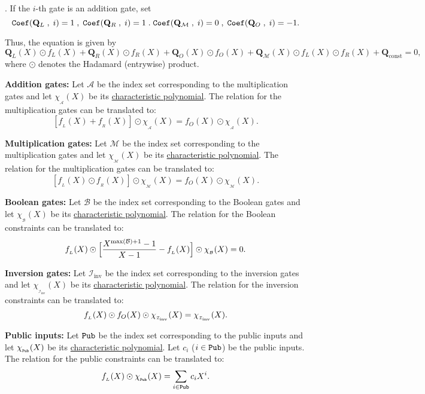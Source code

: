 \documentclass[11pt, lettersize, notitlepage, leqno, footskip=0.6cm]{article}
\newcommand{\mc}{\mathcal}
\newcommand{\mbf}{\mathbf}
\newcommand{\mr}{\mathrm}
\newcommand{\vs}{\vspace{-0.15cm}}
\newcommand{\noin}{\noindent}
\numberwithin{equation}{section}
\begin{document}
\noin 3. If the $i$-th gate is an addition gate, set  \vs $${\tt{Coef}}(\mbf{Q}_{L}\;,\;i) = 1\;,\;{\tt{Coef}}(\mbf{Q}_{R}\;,\;i) = 1 \;.\;{\tt{Coef}}(\mbf{Q}_{\mc{M}}\;,\;i) = 0\;,\;{\tt{Coef}}(\mbf{Q}_{O}\;,\;i) = -1.  $$


\noin Thus, the equation is given by $$ \mbf{Q}_{L}(X)\odot f_{L}(X) + \mbf{Q}_{R}(X)\odot f_{R}(X) + \mbf{Q}_{O}(X)\odot f_{O}(X) + \mbf{Q}_{\mc{M}}(X)\odot f_{L}(X)\odot f_{R}(X) +  \mbf{Q}_{\mr{const}} = 0,$$ where $\odot$ denotes the Hadamard (entrywise) product.

\bigskip






\noin \textbf{Addition gates:} Let $\mc{A}$ be the index set corresponding to the multiplication gates and let $\chi_{_{\mc{A}}}(X)$ be its \hyperlink{charpoly}{characteristic polynomial}. The relation for the multiplication gates can be translated to: \vs $$ [f_{_L}(X)+ f_{_R}(X)] \odot \chi_{_{\mc{A}}}(X)   =  f_{O}(X) \odot \chi_{_{\mc{A}}}(X).  $$ 

\noin \textbf{Multiplication gates:} Let $\mc{M}$ be the index set corresponding to the multiplication gates and let $\chi_{_{\mc{M}}}(X)$ be its \hyperlink{charpoly}{characteristic polynomial}. The relation for the multiplication gates can be translated to: \vs $$ [f_{_L}(X)\odot f_{_R}(X)] \odot \chi_{_{\mc{M}}}(X)   =  f_{O}(X) \odot \chi_{_{\mc{M}}}(X).$$ 

\noin \textbf{Boolean gates:} Let $\mc{B}$ be the index set corresponding to the Boolean gates and let $\chi_{_{\mc{B}}}(X)$ be its \hyperlink{charpoly}{characteristic polynomial}. The relation for the Boolean constraints can be translated to: \vs $$ f_{_L}(X)\odot \Big[ \frac{X^{\max(\mc{B})+1}-1}{X-1} - f_{_L}(X) \Big] \odot  \chi_{_{\mc{B}}}(X) = 0 . \vs $$


\noin \textbf{Inversion gates:} Let $\mc{I}_{\mr{inv}}$ be the index set corresponding to the inversion gates and let $\chi_{_{\mc{I}_{\mr{inv}}}}(X)$ be its \hyperlink{charpoly}{characteristic polynomial}. The relation for the inversion constraints can be translated to: \vs $$ f_{_L}(X)\odot f_{O}(X) \odot  \chi_{_{\mc{\mc{I}_{\mr{inv}}}}}(X) =  \chi_{_{\mc{\mc{I}_{\mr{inv}}}}}(X). \vs $$


\noin \textbf{Public inputs:} Let $\tt{Pub}$ be the index set corresponding to the public inputs and let $\chi_{_{\tt{Pub}}}(X)$ be its \hyperlink{charpoly}{characteristic polynomial}. Let $c_i$ ($i\in \tt{Pub}$) be the public inputs. The relation for the public constraints can be translated to: \vs $$ f_{_L}(X)\odot \chi_{_{\tt{Pub}}}(X) = \sum\limits_{i\in \tt{Pub}} c_iX^i .$$
\end{document}
